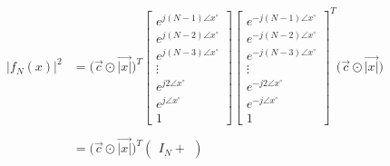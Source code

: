 \documentclass{article}
\begin{document}
\begin{align*}
     \Big|f_{N}(x)\Big|^{2}&= \Big(\vec{c} \odot \vec{|x|}\Big)^{T}\begin{bmatrix}
                                                                        e^{j(N - 1)\angle{x}^{\circ}} \\
                                                                        e^{j(N - 2)\angle{x}^{\circ}} \\
                                                                        e^{j(N - 3)\angle{x}^{\circ}} \\
                                                                        \vdots \\
                                                                        e^{j2\angle{x}^{\circ}} \\
                                                                        e^{j\angle{x}^{\circ}} \\
                                                                        1
                                                                    \end{bmatrix}
                                                                  \begin{bmatrix}
                                                                        e^{-j(N - 1)\angle{x}^{\circ}} \\
                                                                        e^{-j(N - 2)\angle{x}^{\circ}} \\
                                                                        e^{-j(N - 3)\angle{x}^{\circ}} \\
                                                                        \vdots \\
                                                                        e^{-j2\angle{x}^{\circ}} \\
                                                                        e^{-j\angle{x}^{\circ}} \\
                                                                        1
                                                                    \end{bmatrix}^{T}\Big(\vec{c} \odot \vec{|x|}\Big) \\ \\
                           &= \Big(\vec{c} \odot \vec{|x|}\Big)^{T}\begin{pmatrix}I_{N} +

\end{pmatrix}
\end{align*}
\end{document}
